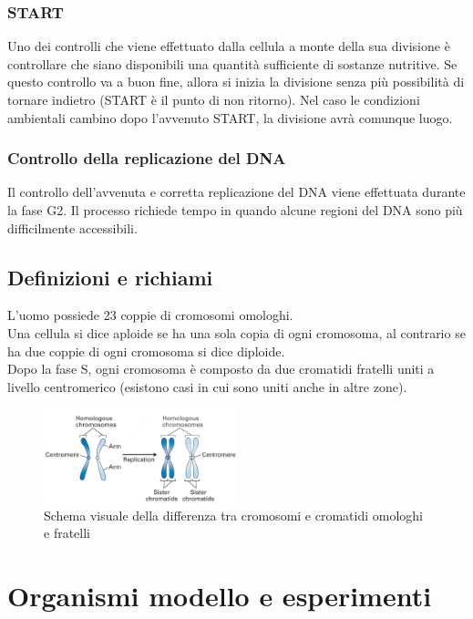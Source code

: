         \subsubsection{START}
            Uno dei controlli che viene effettuato dalla cellula a monte della sua divisione è controllare che siano disponibili una quantità sufficiente di sostanze nutritive. 
            Se questo controllo va a buon fine, allora si inizia la divisione senza più possibilità di tornare indietro (START è il punto di non ritorno). Nel caso le condizioni ambientali cambino dopo l'avvenuto START, la divisione avrà comunque luogo.
        \subsubsection{Controllo della replicazione del DNA}
            Il controllo dell'avvenuta e corretta replicazione del DNA viene effettuata durante la fase G2. Il processo richiede tempo in quando alcune regioni del DNA sono più difficilmente accessibili.
    
    \subsection{Definizioni e richiami}
        L'uomo possiede 23 coppie di cromosomi omologhi. \\
        Una cellula si dice aploide se ha una sola copia di ogni cromosoma, al contrario se ha due coppie di ogni cromosoma si dice diploide. \\
        Dopo la fase S, ogni cromosoma è composto da due cromatidi fratelli uniti a livello centromerico (esistono casi in cui sono uniti anche in altre zone).\\
        \begin{figure}[h]
            \centering
            \includegraphics[width=0.5\textwidth]{images/cromosomiEcromatidi.JPG}
            \caption{\small Schema visuale della differenza tra cromosomi e cromatidi omologhi e fratelli}
            \label{fig:mesh1}
        \end{figure}
    
\section{Organismi modello e esperimenti}
